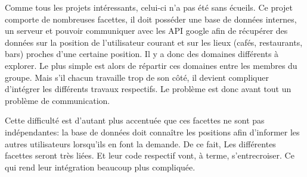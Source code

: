 Comme tous les projets intéressants, celui-ci n'a pas été sans écueils. Ce projet comporte de nombreuses facettes, il doit
posséder une base de données internes, un serveur et pouvoir communiquer avec les API google afin de récupérer des données sur la
position de l'utilisateur courant et sur les lieux (cafés, restaurants, bars) proches d'une certaine position. Il y a donc des
domaines différents à explorer. Le plus simple est alors de répartir ces domaines entre les membres du groupe. Mais s'il chacun
travaille trop de son côté, il devient compliquer d'intégrer les différents travaux respectifs. Le problème est donc avant tout un
problème de communication.
\newline

Cette difficulté est d'autant plus accentuée que ces facettes ne sont pas indépendantes: la base de données doit connaître les
positions afin d'informer les autres utilisateurs lorsqu'ils en font la demande. De ce fait, Les différentes facettes seront très
liées. Et leur code respectif vont, à terme, s'entrecroiser. Ce qui rend leur intégration beaucoup plus compliquée.
